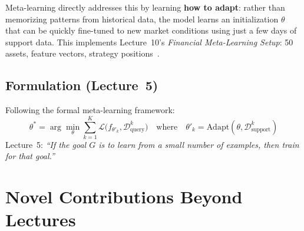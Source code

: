 \documentclass[11pt,a4paper]{article}
\begin{document}
Meta-learning directly addresses this by learning \textbf{how to adapt}: rather than memorizing patterns from historical data, the model learns an initialization $\theta$ that can be quickly fine-tuned to new market conditions using just a few days of support data. This implements Lecture~10's \emph{Financial Meta-Learning Setup}: 50 assets, feature vectors, strategy positions~\cite{numin2024}.

\subsection{Formulation (Lecture~5)}
Following the formal meta-learning framework:
\begin{equation}
  \theta^* = \arg\min_\theta \sum_{k=1}^{K} \mathcal{L}\bigl(f_{\theta'_k}, \mathcal{D}_{\text{query}}^k\bigr) \quad \text{where} \quad \theta'_k = \text{Adapt}(\theta, \mathcal{D}_{\text{support}}^k)
\end{equation}
Lecture~5: \emph{``If the goal $G$ is to learn from a small number of examples, then train for that goal.''}

\section{Novel Contributions Beyond Lectures}
\end{document}
